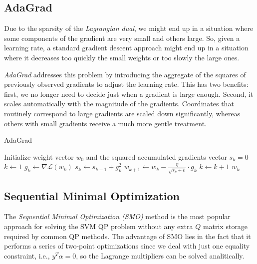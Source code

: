 \subsection{AdaGrad}

Due to the sparsity of the \emph{Lagrangian dual}, we might end up in a situation where some components of the gradient are very small and others large. So, given a learning rate, a standard gradient descent approach might end up in a situation where it decreases too quickly the small weights or too slowly the large ones.

\emph{AdaGrad} \cite{duchi2011adaptive} addresses this problem by introducing the aggregate of the squares of previously observed gradients to adjust the learning rate. This has two benefits: first, we no longer need to decide just when a gradient is large enough. Second, it scales automatically with the magnitude of the gradients. Coordinates that routinely correspond to large gradients are scaled down significantly, whereas others with small gradients receive a much more gentle treatment.

\begin{algorithm}[H]
	\caption{AdaGrad}
	\label{alg:adagrad}
	\begin{algorithmic}
			\State Initialize weight vector $w_0$ and the squared accumulated gradients vector $s_k = 0$
			\State $k \gets 1$
				\State $g_k \gets \nabla \mathcal{L}(w_k)$
				\State $s_k \gets s_{k-1} + g_k^2$
				\State $w_{k+1} \gets w_k - \displaystyle \frac{\eta}{\sqrt{s_k + \epsilon}} \cdot g_k$
				\State $k \gets k + 1$
			\EndWhile
			\State \Return $w_k$
		\EndFunction
	\end{algorithmic}
\end{algorithm}

\subsection{Sequential Minimal Optimization}

The \emph{Sequential Minimal Optimization (SMO)} \cite{platt1998sequential} method is the most popular approach for solving the SVM QP problem without any extra $Q$ matrix storage required by common QP methods. The advantage of SMO lies in the fact that it performs a series of two-point optimizations since we deal with just one equality constraint, i.e., $y^T \alpha=0$, so the Lagrange multipliers can be solved analitically.

